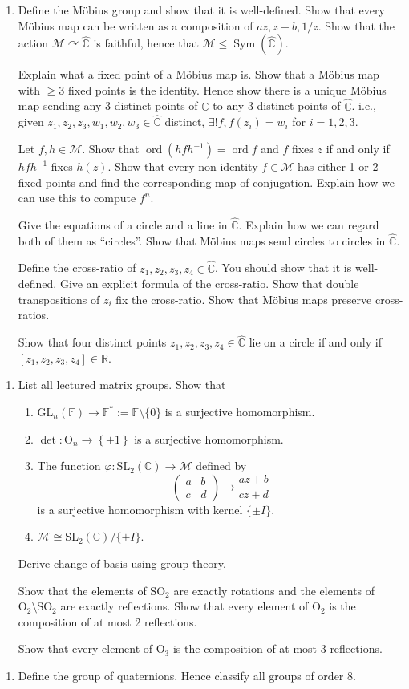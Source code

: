 \documentclass{article}
\newcommand{\mobius}{{M\"{o}bius }}
\newcommand{\mcM}{\mathcal{M}}
\newcommand{\bbC}{\mathbb{C}}
\newcommand{\bbR}{\mathbb{R}}
\newcommand{\bbF}{\mathbb{F}}
\newcommand{\GL}{\mathrm{GL}}
\newcommand{\Or}{\mathrm{O}}
\newcommand{\SL}{\mathrm{SL}}
\newcommand{\SO}{\mathrm{SO}}
\newlength{\qspace}
\newcounter{qnumber}
\newenvironment{question}%
 {\vspace{\qspace}
  \begin{enumerate}[\bfseries 1\quad][10]%
    \setcounter{enumi}{\value{qnumber}}%
    \item%
 }
{
  \end{enumerate}
  \filbreak
  \stepcounter{qnumber}
 }
\DeclareMathOperator{\ord}{ord}
\DeclareMathOperator{\sym}{Sym}
\def\le{\leqslant}
\def\ge{\geqslant}
\begin{document}
\begin{question}
  Define the \mobius group and show that it is well-defined. Show that every \mobius map can be written as a composition of $ az, z+b,1/z $. Show that the action $ \mcM \curvearrowright \hat{\mathbb{C}} $ is faithful, hence that $ \mathcal{M}\le \sym(\hat{\bbC}) $.
  
  Explain what a fixed point of a \mobius map is. Show that a \mobius map with $\ge 3$ fixed points is the identity. Hence show there is a unique \mobius map sending any 3 distinct points of $ \hat{\mathbb{C}} $ to any 3 distinct points of $ \hat{\bbC} $. i.e., given $ z_1,z_2,z_3, w_1,w_2,w_3\in \hat{\bbC} $ distinct, $ \exists ! f, f(z_i)=w_i $ for $i=1,2,3$.

  Let $ f,h\in \mcM $. Show that $ \ord(hfh^{-1})=\ord f $ and $ f $ fixes $z$ if and only if $ hfh^{-1} $ fixes $ h(z) $. Show that every non-identity $f\in \mcM$ has either 1 or 2 fixed points and find the corresponding map of conjugation. Explain how we can use this to compute $ f^n $.

  Give the equations of a circle and a line in $ \hat{\bbC} $. Explain how we can regard both of them as ``circles''. Show that \mobius maps send circles to circles in $ \hat{\bbC} $.

  Define the cross-ratio of $ z_1,z_2,z_3,z_4\in \hat{\bbC} $. You should show that it is well-defined. Give an explicit formula of the cross-ratio. Show that double transpositions of $z_i$ fix the cross-ratio. Show that \mobius maps preserve cross-ratios.

  Show that four distinct points $z_1,z_2,z_3,z_4\in \hat{\bbC}$ lie on a circle if and only if $[z_1,z_2,z_3,z_4]\in \bbR$.
\end{question}

\begin{question}
  List all lectured matrix groups. Show that 
  \begin{enumerate}
    \item $ \GL_n(\bbF) \to \bbF^*:=\bbF \setminus \{0\} $ is a surjective homomorphism.
    \item $ \det : \Or_n\to \left\{ \pm 1 \right\} $ is a surjective homomorphism.
    \item The function $ \varphi:\SL_2(\bbC)\to \mcM $ defined by 
    \[
        \begin{pmatrix}
            a&b\\
            c&d
        \end{pmatrix} \mapsto \frac{az+b}{cz+d}
    \]
    is a surjective homomorphism with kernel $ \{\pm I\} $.
    \item $ \mcM \cong \SL_2(\bbC)/\{\pm I\} $.
  \end{enumerate}

  Derive change of basis using group theory.

  Show that the elements of $ \SO_2 $ are exactly rotations and the elements of $ \Or_2\setminus\SO_2 $ are exactly reflections. Show that every element of $\Or_2$ is the composition of at most 2 reflections.

  Show that every element of $\Or_3$ is the composition of at most 3 reflections.
\end{question}

\begin{question}
  Define the group of quaternions. Hence classify all groups of order 8.
\end{question}
\end{document}
